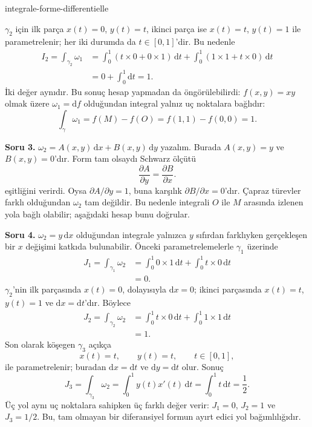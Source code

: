 \begin{exo}{integrale-forme-differentielle}
\begin{solution}
$\gamma_2$ için ilk parça $x(t)=0$, $y(t)=t$, ikinci parça ise
$x(t)=t$, $y(t)=1$ ile parametrelenir; her iki durumda da $t\in[0,1]$'dir.
Bu nedenle
\[
\begin{aligned}
I_2
= \int_{\gamma_2}\omega_1
&= \int_0^1\left(t\times 0+0\times 1\right)\,\mathrm{d}t
 + \int_0^1\left(1\times 1+t\times 0\right)\,\mathrm{d}t \\
&= 0+\int_0^1\mathrm{d}t = 1.
\end{aligned}
\]
İki değer aynıdır. Bu sonuç hesap yapmadan da öngörülebilirdi: $f(x,y)=xy$
olmak üzere $\omega_1=\mathrm{d}f$ olduğundan integral yalnız uç noktalara bağlıdır:
\[
\int_\gamma\omega_1=f(M)-f(O)=f(1,1)-f(0,0)=1.
\]

\textbf{Soru 3.} $\omega_2=A(x,y)\,\mathrm{d}x+B(x,y)\,\mathrm{d}y$ yazalım.
Burada $A(x,y)=y$ ve $B(x,y)=0$'dır. Form tam olsaydı Schwarz ölçütü
\[
\frac{\partial A}{\partial y}=\frac{\partial B}{\partial x}.
\]
eşitliğini verirdi. Oysa $\partial A/\partial y=1$, buna karşılık
$\partial B/\partial x=0$'dır. Çapraz türevler farklı olduğundan $\omega_2$
tam değildir. Bu nedenle integrali $O$ ile $M$ arasında izlenen yola bağlı
olabilir; aşağıdaki hesap bunu doğrular.

\textbf{Soru 4.} $\omega_2=y\,\mathrm{d}x$ olduğundan integrale yalnızca
$y$ sıfırdan farklıyken gerçekleşen bir $x$ değişimi katkıda bulunabilir.
Önceki parametrelemelerle $\gamma_1$ üzerinde
\[
\begin{aligned}
J_1
=\int_{\gamma_1}\omega_2
&=\int_0^1 0\times 1\,\mathrm{d}t
  +\int_0^1 t\times 0\,\mathrm{d}t \\
&=0.
\end{aligned}
\]
$\gamma_2$'nin ilk parçasında $x(t)=0$, dolayısıyla $\mathrm{d}x=0$;
ikinci parçasında $x(t)=t$, $y(t)=1$ ve $\mathrm{d}x=\mathrm{d}t$'dır. Böylece
\[
\begin{aligned}
J_2
=\int_{\gamma_2}\omega_2
&=\int_0^1 t\times 0\,\mathrm{d}t
  +\int_0^1 1\times 1\,\mathrm{d}t \\
&=1.
\end{aligned}
\]
Son olarak köşegen $\gamma_3$ açıkça
\[
x(t)=t,\qquad y(t)=t,\qquad t\in[0,1],
\]
ile parametrelenir; buradan $\mathrm{d}x=\mathrm{d}t$ ve
$\mathrm{d}y=\mathrm{d}t$ olur. Sonuç
\[
J_3
=\int_{\gamma_3}\omega_2
=\int_0^1 y(t)x'(t)\,\mathrm{d}t
=\int_0^1 t\,\mathrm{d}t
=\frac12.
\]
Üç yol aynı uç noktalara sahipken üç farklı değer verir: $J_1=0$, $J_2=1$
ve $J_3=1/2$. Bu, tam olmayan bir diferansiyel formun ayırt edici yol bağımlılığıdır.
\end{solution}
\end{exo}

